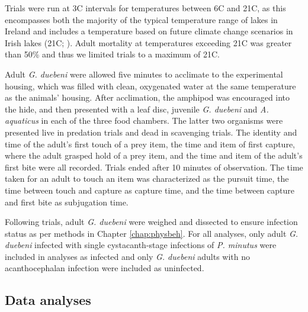 Trials were run at 3\degree C intervals for temperatures between 6\degree C and 21\degree C, as this encompasses both the majority of the typical temperature range of lakes in Ireland and includes a temperature based on future climate change scenarios in Irish lakes (21\degree C; \cite{ipcc2014}). Adult mortality at temperatures exceeding 21\degree C was greater than 50\% and thus we limited trials to a maximum of 21\degree C. 

Adult \emph{G. duebeni} were allowed five minutes to acclimate to the experimental housing, which was filled with clean, oxygenated water at the same temperature as the animals' housing. After acclimation, the amphipod was encouraged into the hide, and then presented with a leaf disc, juvenile \emph{G. duebeni} and \emph{A. aquaticus} in each of the three food chambers. The latter two organisms were presented live in predation trials and dead in scavenging trials. The identity and time of the adult’s first touch of a prey item, the time and item of first capture, where the adult grasped hold of a prey item, and the time and item of the adult’s first bite were all recorded. Trials ended after 10 minutes of observation. The time taken for an adult to touch an item was characterized as the pursuit time, the time between touch and capture as capture time, and the time between capture and first bite as subjugation time. 

Following trials, adult \emph{G. duebeni} were weighed and dissected to ensure infection status as per methods in Chapter \ref{chap:physbeh}. For all analyses, only adult \emph{G. duebeni} infected with single cystacanth-stage infections of \emph{P. minutus} were included in analyses as infected and only \emph{G. duebeni} adults with no acanthocephalan infection were included as uninfected. 

\subsection{Data analyses}

